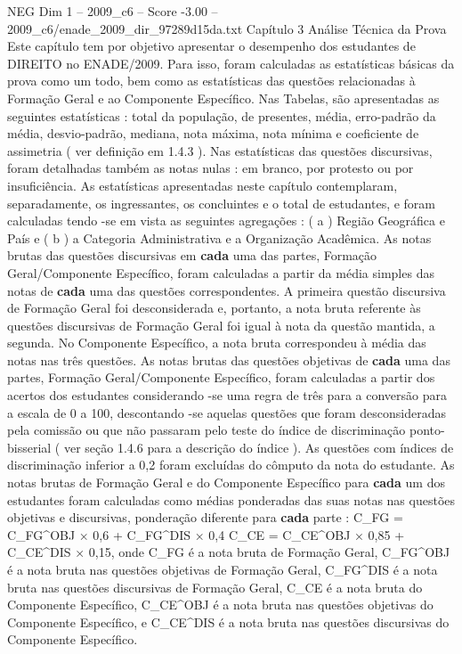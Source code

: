 \begin{textsample}{NEG Dim 1 – 2009\_c6 – Score -3.00 – 2009\_c6/enade\_2009\_dir\_97289d15da.txt}  \label{ex:f1_neg_219}
Capítulo 3 Análise Técnica da Prova Este capítulo tem por objetivo apresentar o desempenho dos estudantes de DIREITO no ENADE/2009.
Para isso, foram calculadas as estatísticas básicas da prova como um todo, bem como as estatísticas das questões relacionadas à Formação Geral e ao Componente Específico.
Nas Tabelas, são apresentadas as seguintes estatísticas : total da população, de presentes, média, erro-padrão da média, desvio-padrão, mediana, nota máxima, nota mínima e coeficiente de assimetria ( ver definição em 1.4.3 ).
Nas estatísticas das questões discursivas, foram detalhadas também as notas nulas : em branco, por protesto ou por insuficiência.
As estatísticas apresentadas neste capítulo contemplaram, separadamente, os ingressantes, os concluintes e o total de estudantes, e foram calculadas tendo -se em vista as seguintes agregações : ( a ) Região Geográfica e País e ( b ) a Categoria Administrativa e a Organização Acadêmica.
As notas brutas das questões discursivas em \textbf{cada} uma das partes, Formação Geral/Componente Específico, foram calculadas a partir da média simples das notas de \textbf{cada} uma das questões correspondentes.
A primeira questão discursiva de Formação Geral foi desconsiderada e, portanto, a nota bruta referente às questões discursivas de Formação Geral foi igual à nota da questão mantida, a segunda.
No Componente Específico, a nota bruta correspondeu à média das notas nas três questões.
As notas brutas das questões objetivas de \textbf{cada} uma das partes, Formação Geral/Componente Específico, foram calculadas a partir dos acertos dos estudantes considerando -se uma regra de três para a conversão para a escala de 0 a 100, descontando -se aquelas questões que foram desconsideradas pela comissão ou que não passaram pelo teste do índice de discriminação ponto-bisserial ( ver seção 1.4.6 para a descrição do índice ).
As questões com índices de discriminação inferior a 0,2 foram excluídas do cômputo da nota do estudante.
As notas brutas de Formação Geral e do Componente Específico para \textbf{cada} um dos estudantes foram calculadas como médias ponderadas das suas notas nas questões objetivas e discursivas, ponderação diferente para \textbf{cada} parte : C\_FG = C\_FG\textasciicircum{}OBJ × 0,6 + C\_FG\textasciicircum{}DIS × 0,4 C\_CE = C\_CE\textasciicircum{}OBJ × 0,85 + C\_CE\textasciicircum{}DIS × 0,15, onde C\_FG é a nota bruta de Formação Geral, C\_FG\textasciicircum{}OBJ é a nota bruta nas questões objetivas de Formação Geral, C\_FG\textasciicircum{}DIS é a nota bruta nas questões discursivas de Formação Geral, C\_CE é a nota bruta do Componente Específico, C\_CE\textasciicircum{}OBJ é a nota bruta nas questões objetivas do Componente Específico, e C\_CE\textasciicircum{}DIS é a nota bruta nas questões discursivas do Componente Específico.

\end{textsample}

